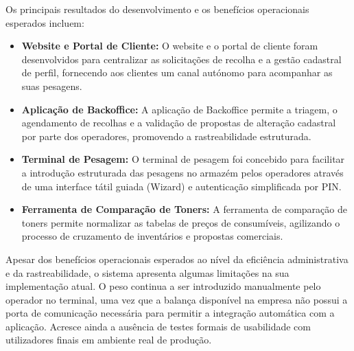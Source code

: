 Os principais resultados do desenvolvimento e os benefícios operacionais esperados incluem:
\begin{itemize}
    \item \textbf{Website e Portal de Cliente:} O website e o portal de cliente foram desenvolvidos para centralizar as solicitações de recolha e a gestão cadastral de perfil, fornecendo aos clientes um canal autónomo para acompanhar as suas pesagens.
    \item \textbf{Aplicação de Backoffice:} A aplicação de Backoffice permite a triagem, o agendamento de recolhas e a validação de propostas de alteração cadastral por parte dos operadores, promovendo a rastreabilidade estruturada.
    \item \textbf{Terminal de Pesagem:} O terminal de pesagem foi concebido para facilitar a introdução estruturada das pesagens no armazém pelos operadores através de uma interface tátil guiada (Wizard) e autenticação simplificada por PIN.
    \item \textbf{Ferramenta de Comparação de Toners:} A ferramenta de comparação de toners permite normalizar as tabelas de preços de consumíveis, agilizando o processo de cruzamento de inventários e propostas comerciais.
\end{itemize}

Apesar dos benefícios operacionais esperados ao nível da eficiência administrativa e da rastreabilidade, o sistema apresenta algumas limitações na sua implementação atual. O peso continua a ser introduzido manualmente pelo operador no terminal, uma vez que a balança disponível na empresa não possui a porta de comunicação necessária para permitir a integração automática com a aplicação. Acresce ainda a ausência de testes formais de usabilidade com utilizadores finais em ambiente real de produção.